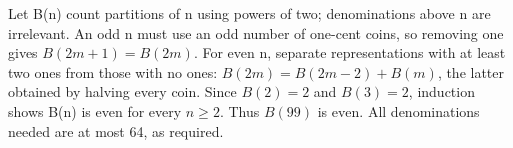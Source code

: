 Let B(n) count partitions of n using powers of two; denominations above n are irrelevant. An odd n must use an odd number of one-cent coins, so removing one gives $B(2m+1)=B(2m)$. For even n, separate representations with at least two ones from those with no ones: $B(2m)=B(2m-2)+B(m)$, the latter obtained by halving every coin. Since $B(2)=2$ and $B(3)=2$, induction shows B(n) is even for every $n\ge2$. Thus $B(99)$ is $\boxed{\text{even}}$. All denominations needed are at most 64, as required.
